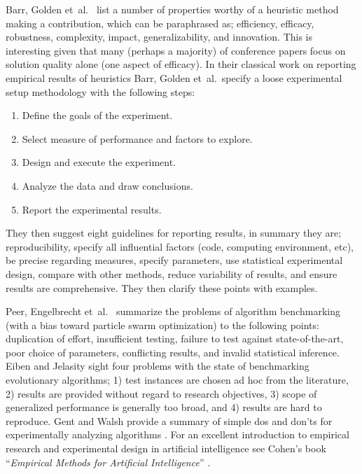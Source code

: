 Barr, Golden et~al.\ \cite{Barr1995} list a number of properties worthy of a heuristic method making a contribution, which can be paraphrased as; efficiency, efficacy, robustness, complexity, impact, generalizability, and innovation. This is interesting given that many (perhaps a majority) of conference papers focus on solution quality alone (one aspect of efficacy).
In their classical work on reporting empirical results of heuristics Barr, Golden et~al.\ specify a loose experimental setup methodology with the following steps:

\begin{enumerate}
	\item Define the goals of the experiment.
	\item Select measure of performance and factors to explore.
	\item Design and execute the experiment.
	\item Analyze the data and draw conclusions.
	\item Report the experimental results.
\end{enumerate}

They then suggest eight guidelines for reporting results, in summary they are; reproducibility, specify all influential factors (code, computing environment, etc), be precise regarding measures, specify parameters, use statistical experimental design, compare with other methods, reduce variability of results, and ensure results are comprehensive. They then clarify these points with examples.

Peer, Engelbrecht et~al.\ \cite{Peer2003} summarize the problems of algorithm benchmarking (with a bias toward particle swarm optimization) to the following points: duplication of effort, insufficient testing, failure to test against state-of-the-art, poor choice of parameters, conflicting results, and invalid statistical inference. Eiben and Jelasity \cite{Eiben2002} sight four problems with the state of benchmarking evolutionary algorithms; 1) test instances are chosen ad hoc from the literature, 2) results are provided without regard to research objectives, 3) scope of generalized performance is generally too broad, and 4) results are hard to reproduce.
Gent and Walsh provide a summary of simple dos and don'ts for experimentally analyzing algorithms \cite{Gent1994}. For an excellent introduction to empirical research and experimental design in artificial intelligence see Cohen's book ``\emph{Empirical Methods for Artificial Intelligence}'' \cite{Cohen1995}.

